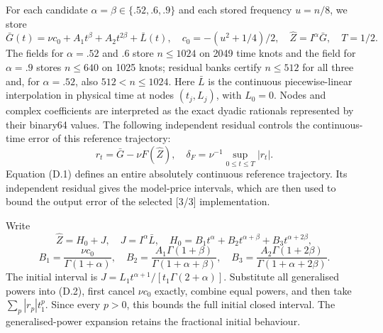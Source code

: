 \documentclass[11pt,a4paper]{article}
\begin{document}
For each candidate \(\alpha=\beta\in\{.52,.6,.9\}\) and each stored frequency \(u=n/8\), we store
\begin{equation*}\tag{D.1}
\bar G(t)=\nu c_0+A_1t^\beta+A_2t^{2\beta}+\bar L(t),\quad
c_0=-(u^2+1/4)/2,\quad \widehat Z=I^\alpha\bar G,\quad T=1/2.
\end{equation*}
The fields for \(\alpha=.52\) and \(.6\) store \(n\le1024\) on 2049 time knots and the field for \(\alpha=.9\) stores \(n\le640\) on 1025 knots; residual banks certify \(n\le512\) for all three and, for \(\alpha=.52\), also \(512<n\le1024\). Here \(\bar L\) is the continuous piecewise-linear interpolation in physical time at nodes \((t_j,L_j)\), with \(L_0=0\). Nodes and complex coefficients are interpreted as the exact dyadic rationals represented by their binary64 values. The following independent residual controls the continuous-time error of this reference trajectory:
\begin{equation*}\tag{D.2}
r_t=\bar G-\nu F(\widehat Z),\quad
\delta_F=\nu^{-1}\sup_{0\le t\le T}|r_t|.
\end{equation*}
Equation (D.1) defines an entire absolutely continuous reference trajectory. Its independent residual gives the model-price intervals, which are then used to bound the output error of the selected [3/3] implementation.

Write
\[
\widehat Z=H_0+J,\quad J=I^\alpha\bar L,\quad
H_0=B_1t^\alpha+B_2t^{\alpha+\beta}+B_3t^{\alpha+2\beta},
\]
\begin{equation*}\tag{D.3}
B_1=\frac{\nu c_0}{\Gamma(1+\alpha)},\quad
B_2=\frac{A_1\Gamma(1+\beta)}{\Gamma(1+\alpha+\beta)},\quad
B_3=\frac{A_2\Gamma(1+2\beta)}{\Gamma(1+\alpha+2\beta)}.
\end{equation*}
The initial interval is \(J=L_1t^{\alpha+1}/[t_1\Gamma(2+\alpha)]\). Substitute all generalised powers into (D.2), first cancel \(\nu c_0\) exactly, combine equal powers, and then take \(\sum_p|r_p|t_1^p\). Since every \(p>0\), this bounds the full initial closed interval. The generalised-power expansion retains the fractional initial behaviour.
\end{document}
